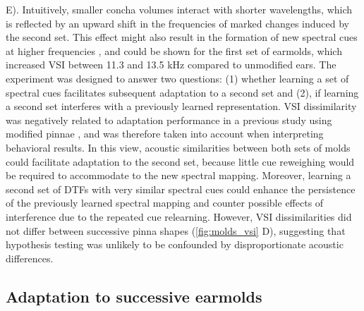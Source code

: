 E). Intuitively, smaller concha volumes interact with shorter wavelengths, which is reflected by an upward shift in the frequencies of marked changes induced by the second set. This effect might also result in the formation of new spectral cues at higher frequencies \citep{wanrooij_relearning_2005}, and could be shown for the first set of earmolds, which increased VSI between 11.3 and 13.5 kHz compared to unmodified ears. The experiment was designed to answer two questions: (1) whether learning a set of spectral cues facilitates subsequent adaptation to a second set and (2), if learning a second set interferes with a previously learned representation. VSI dissimilarity was negatively related to adaptation performance in a previous study using modified pinnae \citep{trapeau_fast_2016}, and was therefore taken into account when interpreting behavioral results. In this view, acoustic similarities between both sets of molds could facilitate adaptation to the second set, because little cue reweighing would be required to accommodate to the new spectral mapping. Moreover, learning a second set of DTFs with very similar spectral cues could enhance the persistence of the previously learned spectral mapping and counter possible effects of interference due to the repeated cue relearning. However, VSI dissimilarities did not differ between successive pinna shapes (\cref{fig:molds_vsi} D), suggesting that hypothesis testing was unlikely to be confounded by disproportionate acoustic differences. 

\subsection{Adaptation to successive earmolds}

